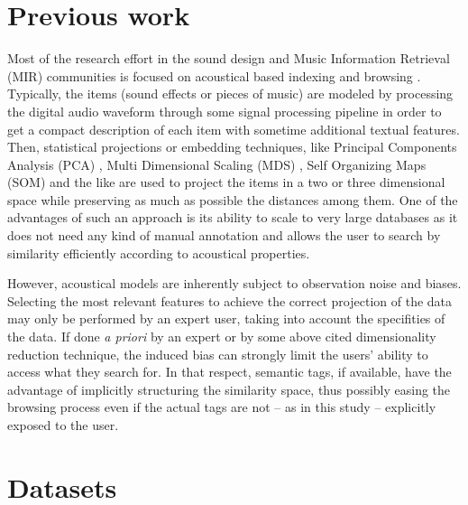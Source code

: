 \documentclass{aes2e}
\begin{document}
\section{Previous work} \label{previous}

Most of the research effort in the sound design and Music Information Retrieval (MIR) communities is focused on acoustical based indexing and browsing \cite{tzanetakis2003musescape, streich2008music,goto2005musicream,pampalk2007musicsun}. Typically, the items (sound effects or pieces of music) are modeled by processing the digital audio waveform through some signal processing pipeline in order to get a compact description of each item
\cite{coleman2007mused} with sometime additional textual features. Then, statistical projections or embedding techniques, like Principal Components Analysis (PCA) \cite{MusicBox},  Multi Dimensional Scaling (MDS) \cite{schwarz2009sound,Cano2002}, Self Organizing Maps (SOM) \cite{pampalk2004exploring,pampalk2006musicrainbow,knees2006innovative} and the like are used to project the items in a two or three dimensional space while preserving as much as possible the distances among them. One of the advantages of such an approach is its ability to scale to very large databases \cite{schwarz2009scalability} as it does not need any kind of manual annotation and allows the user to search by similarity efficiently according to acoustical properties.

However, acoustical models are inherently subject to observation noise and biases. Selecting the most relevant features to achieve the correct projection of the data may only be performed by an expert user, taking into account the specifities of the data. If done \textit{a priori} by an expert or by some above cited dimensionality reduction technique, the induced bias can strongly limit the users' ability to access what they search for. In that respect, semantic tags, if available, have the advantage of implicitly structuring the similarity space, thus possibly easing the browsing process even if the actual tags are not -- as in this study -- explicitly exposed to the user.

\section{Datasets} \label{dataset}
\end{document}
